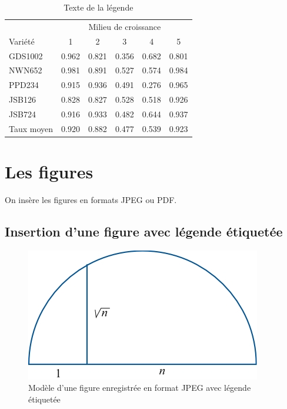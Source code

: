 \documentclass[10pt]{article}
\begin{document}
\begin{table}
\centering
\begin{tabular}{lccccc}
\toprule
& \multicolumn{5}{c}{Milieu de croissance} \\
\cmidrule(l){2-6}
Variété & 1 & 2 & 3 & 4 & 5\\
\midrule
GDS1002 & 0.962 & 0.821 & 0.356 & 0.682 & 0.801\\   %
NWN652 & 0.981 & 0.891 & 0.527 & 0.574 & 0.984\\      %
PPD234 & 0.915 & 0.936 & 0.491 & 0.276 & 0.965\\        %
JSB126 & 0.828 & 0.827 & 0.528 & 0.518 & 0.926\\        %
JSB724 & 0.916 & 0.933 & 0.482 & 0.644 & 0.937\\        %
\midrule
\midrule
Taux moyen & 0.920 & 0.882 & 0.477 & 0.539 & 0.923\\
\bottomrule
\end{tabular}
\caption{Texte de la légende}
\label{tab:template}
\end{table}

\hypertarget{les-figures}{%
\section{\texorpdfstring{Les figures
\label{fig}}{Les figures }}\label{les-figures}}

On insère les figures en formats JPEG ou PDF.

\hypertarget{insertion-dune-figure-avec-luxe9gende-uxe9tiquetuxe9e}{%
\subsection{\texorpdfstring{Insertion d'une figure avec légende
étiquetée
\label{fig+eti}}{Insertion d'une figure avec légende étiquetée }}\label{insertion-dune-figure-avec-luxe9gende-uxe9tiquetuxe9e}}

\begin{figure}[ht]
\centerline{\includegraphics[scale=.8]{pics/Figure1}} \caption{ \label{Modele figure1} Modèle d'une figure enregistrée en format JPEG avec légende étiquetée }
\end{figure}
\end{document}
